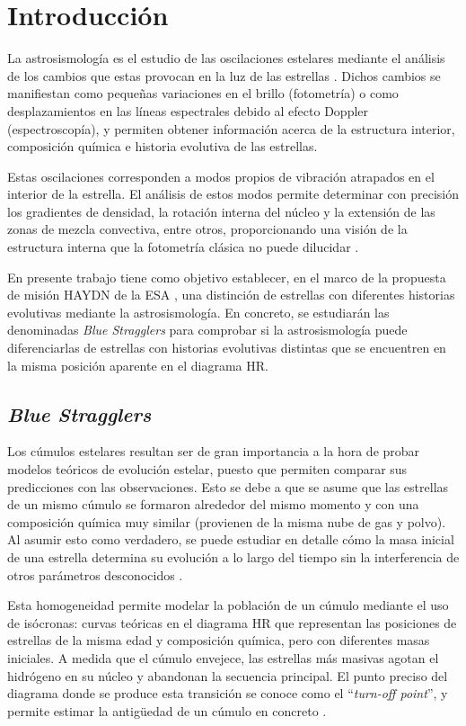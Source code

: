 \chapter{Introducción}

La astrosismología es el estudio de las oscilaciones estelares mediante el análisis de los cambios que estas provocan en la luz de las estrellas \citep{ChristensenDalsgaard2019}. Dichos cambios se manifiestan como pequeñas variaciones en el brillo (fotometría) o como desplazamientos en las líneas espectrales debido al efecto Doppler (espectroscopía), y permiten obtener información acerca de la estructura interior, composición química e historia evolutiva de las estrellas.

Estas oscilaciones corresponden a modos propios de vibración atrapados en el interior de la estrella. El análisis de estos modos permite determinar con precisión los gradientes de densidad, la rotación interna del núcleo y la extensión de las zonas de mezcla convectiva, entre otros, proporcionando una visión de la estructura interna que la fotometría clásica no puede dilucidar \citep{ChristensenDalsgaard2019}.

En presente trabajo tiene como objetivo establecer, en el marco de la propuesta de misión HAYDN de la ESA \citep{haydn_mission_proposal_2026}, una distinción de estrellas con diferentes historias evolutivas mediante la astrosismología. En concreto, se estudiarán las denominadas \textit{Blue Stragglers} para comprobar si la astrosismología puede diferenciarlas de estrellas con historias evolutivas distintas que se encuentren en la misma posición aparente en el diagrama HR.

\section{\textit{Blue Stragglers}}

Los cúmulos estelares resultan ser de gran importancia a la hora de probar modelos teóricos de evolución estelar, puesto que permiten comparar sus predicciones con las observaciones. Esto se debe a que se asume que las estrellas de un mismo cúmulo se formaron alrededor del mismo momento y con una composición química muy similar (provienen de la misma nube de gas y polvo). Al asumir esto como verdadero, se puede estudiar en detalle cómo la masa inicial de una estrella determina su evolución a lo largo del tiempo sin la interferencia de otros parámetros desconocidos \citep{TASC8KASC15AbstractBooklet}.

Esta homogeneidad permite modelar la población de un cúmulo mediante el uso de isócronas: curvas teóricas en el diagrama HR que representan las posiciones de estrellas de la misma edad y composición química, pero con diferentes masas iniciales. A medida que el cúmulo envejece, las estrellas más masivas agotan el hidrógeno en su núcleo y abandonan la secuencia principal. El punto preciso del diagrama donde se produce esta transición se conoce como el ``\textit{turn-off point}'', y permite estimar la antigüedad de un cúmulo en concreto \citep{wang2024bluestragglerstars}.


